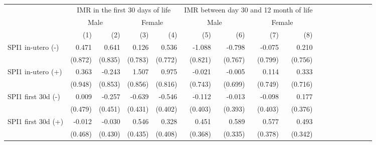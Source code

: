 \begin{table}[H]
\centering
\caption{}
\label{table5}
\begin{adjustbox}{max width=\linewidth}
\begin{tabular}{lrrrrrrrrrrrrrrrr}
\toprule
                                            &      \multicolumn{4}{c}{IMR in the first 30 days of life}     &   \multicolumn{4}{c}{IMR between day 30 and 12 month of life}      \\ 
\cmidrule(lr){2-5} \cmidrule(lr){6-9} \cmidrule(lr){10-13} \cmidrule(lr){14-17} 
                                            &      \multicolumn{2}{c}{Male} &      \multicolumn{2}{c}{Female}     &  \multicolumn{2}{c}{Male} &      \multicolumn{2}{c}{Female}      \\ 
\cmidrule(lr){2-5} \cmidrule(lr){6-9} \cmidrule(lr){10-13} \cmidrule(lr){14-17} 
                                            &        (1) &        (2) &        (3) &        (4) &       (5) &       (6) &       (7) &       (8)  \\ 
\midrule 
SPI1 in-utero  (-)                           &       0.471 &       0.641 &     0.126 &       0.536 &        -1.088 &       -0.798  &     -0.075 &        0.210 \\
                                             &     (0.872) &     (0.835) &   (0.783) &     (0.772) &       (0.821) &      (0.767)  &    (0.799) &      (0.756) \\
SPI1 in-utero  (+)                           &       0.363 &      -0.243 &     1.507 &       0.975 &        -0.021 &       -0.005  &      0.114 &        0.333 \\
                                             &     (0.948) &     (0.853) &   (0.856) &     (0.816) &       (0.743) &      (0.699)  &    (0.749) &      (0.716) \\
SPI1 first 30d  (-)                          &       0.009 &      -0.257 &    -0.639 &      -0.546 &        -0.112 &       -0.013  &     -0.098 &        0.177 \\
                                             &     (0.479) &     (0.451) &   (0.431) &     (0.402) &       (0.403) &      (0.393)  &    (0.403) &      (0.376) \\
SPI1 first 30d  (+)                          &      -0.012 &      -0.030 &     0.546 &       0.328 &         0.451 &        0.589  &      0.577 &        0.493 \\
                                             &     (0.468) &     (0.430) &   (0.435) &     (0.408) &       (0.368) &      (0.335)  &    (0.378) &      (0.342) \\

\end{tabular}
\end{adjustbox}
\end{table}
